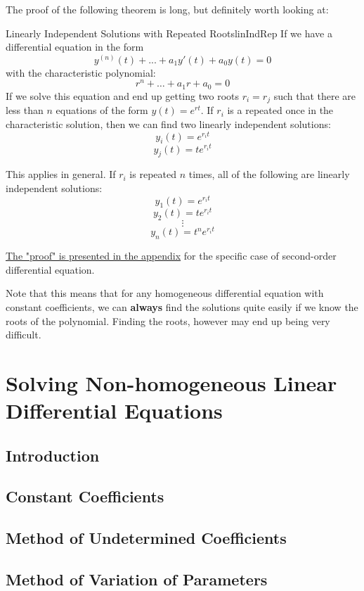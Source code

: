 \documentclass{report}
\begin{document}
The proof of the following theorem is long, but definitely worth looking at:


\begin{mytheo}{Linearly Independent Solutions with Repeated Roots}{linIndRep}
    If we have a differential equation in the form 
    $$y^{(n)}(t) + ... + a_1y'(t) + a_0y(t) = 0$$
    with the characteristic polynomial:
    $$r^n+\dots+a_1r+a_0=0$$
    If we solve this equation and end up getting two roots $r_i=r_j$ such that there are less than $n$ equations of the form $y(t) = e^{rt}$. 
    If $r_i$ is a repeated once in the characteristic solution, then we can find two linearly independent solutions:
    $$y_i(t) = e^{r_it}$$
    $$y_j(t) = te^{r_it}$$
    
    This applies in general. If $r_i$ is repeated $n$ times, all of the following are linearly independent solutions:
    $$y_1(t) = e^{r_it}$$
    $$y_2(t) = te^{r_it}$$
    $$\vdots$$
    $$y_n(t) = t^ne^{r_it}$$
\end{mytheo}

\label{repRoot}
\hyperref[sec:PrRepRoot]{The "proof" is presented in the appendix} for the specific case of second-order differential equation. 

Note that this means that for any homogeneous differential equation with constant coefficients, we can \textbf{always} find the solutions quite easily if we know the roots of the polynomial. Finding the roots, however may end up being very difficult.




\chapter{Solving Non-homogeneous Linear Differential Equations}
\section{Introduction}
\section{Constant Coefficients}
\section{Method of Undetermined Coefficients}
\section{Method of Variation of Parameters}
\end{document}
